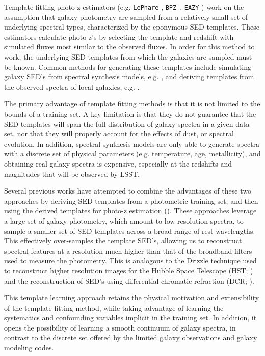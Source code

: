 \documentclass[twocolumn]{aastex63}
\newcommand{\pzcode}[1]{\texttt{#1}}
\newcommand{\bpz}{\pzcode{BPZ}}
\begin{document}
    Template fitting photo-z estimators (e.g. \texttt{LePhare} \citealt{Arnouts1999}, \bpz\ \citealt{Benitez2000a}, \texttt{EAZY} \citealt{Brammer2008}) work on the assumption that galaxy photometry are sampled from a relatively small set of underlying spectral types, characterized by the eponymous SED templates. 
    These estimators calculate photo-z's by selecting the template and redshift with simulated fluxes most similar to the observed fluxes. 
    In order for this method to work, the underlying SED templates from which the galaxies are sampled must be known. 
    Common methods for generating these templates include simulating galaxy SED's from spectral synthesis models, e.g. \citet{BruzualA.1993a}, and deriving templates from the observed spectra of local galaxies, e.g. \citet{Benitez2004a}. 

    The primary advantage of template fitting methods is that it is not limited to the bounds of a training set. 
    A key limitation is that they do not guarantee that the SED templates will span the full distribution of galaxy spectra in a given data set, nor that they will properly account for the effects of dust, or spectral evolution.
    In addition, spectral synthesis models are only able to generate spectra with a discrete set of physical parameters (e.g. temperature, age, metallicity), and obtaining real galaxy spectra is expensive, especially at the redshifts and magnitudes that will be observed by LSST.

    Several previous works have attempted to combine the advantages of these two approaches by deriving SED templates from a photometric training set, and then using the derived templates for photo-z estimation (\citealt{Budavari2000b,Csabai2000}). These approaches
    leverage a large set of galaxy photometry, which amount to low resolution spectra, to sample a smaller set of SED templates across a broad range of rest wavelengths.
    This effectively over-samples the template SED's, allowing us to reconstruct spectral features at a resolution much higher than that of the broadband filters used to measure the photometry.
    This  is analogous to the Drizzle technique used to reconstruct higher resolution images for the Hubble Space Telescope (HST; \citealt{Fruchter2002}) and the reconstruction of SED's using differential chromatic refraction (DCR; \citealt{Lee2019}).


    This template learning approach retains the physical motivation and extensibility of the template fitting method, while taking advantage of learning the systematics and confounding variables implicit in the training set.
    In addition, it opens the possibility of learning a smooth continuum of galaxy spectra, in contrast to the discrete set offered by the limited galaxy observations and galaxy modeling codes. 
\end{document}
